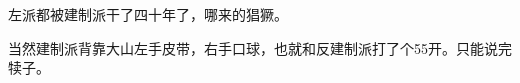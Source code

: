 \begin{zhihuanswer}
左派都被建制派干了四十年了，哪来的猖獗。

当然建制派背靠大山左手皮带，右手口球，也就和反建制派打了个55开。只能说完犊子。
\end{zhihuanswer}
